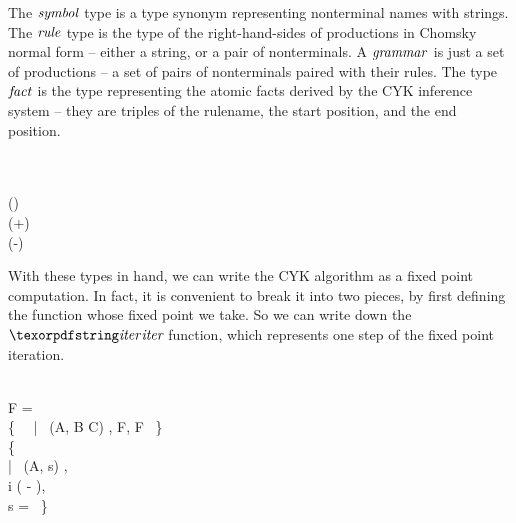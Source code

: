 \noindent
The $\tsymbol$ type is a type synonym representing nonterminal names
with strings. The $\typename{rule}$ type is the type of the right-hand-sides
of productions in Chomsky normal form -- either a string, or a pair of
nonterminals. A $\tgrammar$ is just a set of productions -- a set
of pairs of nonterminals paired with their rules. The type $\tfact$
is the type representing the atomic facts derived by the CYK inference
system -- they are triples of the rulename, the start position, and
the end position.


\begin{code}
   \isa \iso\tstring \to \tint\\
   \isa \iso \tint \to \tint \to \tset{\tint}\\
   \isa \iso(\tstring \x \tint \x \tint) \to \tstring\\
  (+) \isa \tint \to \tint \to \tint\\
  (-) \isa \tint \to \iso\tint \to \tint
\end{code}

With these types in hand, we can write the CYK algorithm as a fixed point
computation. In fact, it is convenient to break it into two pieces, by first
defining the function whose fixed point we take. So we can write down the
$\name{iter}$ function, which represents one step of the fixed point iteration.

\begin{code}
   \isa \iso \tstring \to \iso\tgrammar
  \to \tset{\tfact} \to \tset{\tfact}\\
   \< \< \<F =
  \\\phantom{\quad\cup{}} \{~
  ~|~
  (\dvar A,  \<\dvar B \<\dvar C) \in {},
   \in F,
   \in F ~\}
  \\\quad\cup \{~
  \\\phantom{\quad\cup{}} |~
  (\dvar A, \<\dvar s) \in {},
  \\\phantom{\quad\cup{}} \phantom{|~}
  \dvar i \in {} \< \<( \< - ),
  \\\phantom{\quad\cup{}} \phantom{|~} \dvar s =
   \<
  ~\}
\end{code}


